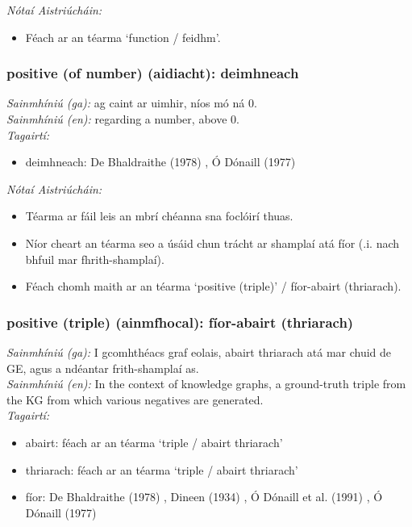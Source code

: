  \noindent \textit{Nótaí Aistriúcháin:}
\begin{itemize}
	\item Féach ar an téarma `function / feidhm'.
\end{itemize}


\subsubsection*{positive (of number) (aidiacht): deimhneach}
 \noindent \textit{Sainmhíniú (ga):} ag caint ar uimhir, níos mó ná 0.
\\
 \noindent \textit{Sainmhíniú (en):} regarding a number, above 0.
\\
 \noindent \textit{Tagairtí:}
\begin{itemize}
	\item deimhneach: De Bhaldraithe (1978) \cite{de-bhaldraithe}, Ó Dónaill (1977) \cite{odonaill}
\end{itemize}

 \noindent \textit{Nótaí Aistriúcháin:}
\begin{itemize}
	\item Téarma ar fáil leis an mbrí chéanna sna foclóirí thuas.
	\item Níor cheart an téarma seo a úsáid chun trácht ar shamplaí atá fíor (.i. nach bhfuil mar fhrith-shamplaí).
	\item Féach chomh maith ar an téarma `positive (triple)' / fíor-abairt (thriarach).
\end{itemize}


\subsubsection*{positive (triple) (ainmfhocal): fíor-abairt (thriarach)}
 \noindent \textit{Sainmhíniú (ga):} I gcomhthéacs graf eolais, abairt thriarach atá mar chuid de GE, agus a ndéantar frith-shamplaí as.
\\
 \noindent \textit{Sainmhíniú (en):} In the context of knowledge graphs, a ground-truth triple from the KG from which various negatives are generated.
\\
 \noindent \textit{Tagairtí:}
\begin{itemize}
	\item abairt: féach ar an téarma `triple / abairt thriarach'
	\item thriarach: féach ar an téarma `triple / abairt thriarach'
	\item fíor: De Bhaldraithe (1978) \cite{de-bhaldraithe}, Dineen (1934) \cite{dineen}, Ó Dónaill et al. (1991) \cite{focloir-beag}, Ó Dónaill (1977) \cite{odonaill}
\end{itemize}

